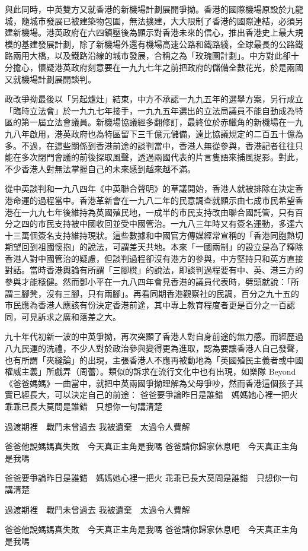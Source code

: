 與此同時，中英雙方又就香港的新機場計劃展開爭拗。香港的國際機場原設於九龍城，隨城市發展已被建築物包圍，無法擴建，大大限制了香港的國際連結，必須另建新機場。港英政府在六四鎮壓後為顯示對香港未來的信心，推出香港史上最大規模的基建發展計劃，除了新機場外還有機場高速公路和鐵路綫，全球最長的公路鐵路兩用大橋，以及鐵路沿線的城市發展，合稱之為「玫瑰園計劃」。中方對此卻十分擔心，懷疑港英政府刻意要在一九九七年之前把政府的儲備全數花光，於是兩國又就機場計劃展開談判。

政改爭拗最後以「另起爐灶」結束，中方不承認一九九五年的選舉方案，另行成立「臨時立法會」於一九九七年接手，一九九五年選出的立法局議員不能自動成為特區的第一屆立法會議員。新機場協議經多翻修訂，最終位於赤鱲角的新機場在一九九八年啟用，港英政府也為特區留下三千億元儲備，遠比協議規定的二百五十億為多。不過，在這些關係到香港前途的談判當中，香港人無從參與，香港記者往往只能在多次閉門會議的前後探取風聲，透過兩國代表的片言隻語來捕風捉影。對此，不少香港人對無法掌握自己的未來感到越來越不滿。

從中英談判和一九八四年《中英聯合聲明》的草議開始，香港人就被排除在決定香港命運的過程當中。香港革新會在一九八二年的民意調查就顯示由七成市民希望香港在一九九七年後維持為英國殖民地，一成半的市民支持改由聯合國託管，只有百分之四的市民支持被中國收回並受中國管治。一九八三年時又有簽名運動，多達六十三萬個簽名支持維持現狀。這些數據和中國官方傳媒經常宣稱的「香港同胞熱切期望回到祖國懷抱」的說法，可謂差天共地。本來「一國兩制」的設立是為了釋除香港人對中國管治的疑慮，但談判過程卻沒有港方的參與，中方堅持只和英方直接對話。當時香港輿論有所謂「三腳櫈」的說法，即談判過程要有中、英、港三方的參與才能穩健。然而鄧小平在一九八四年會見香港的議員代表時，劈頭就說：「所謂三腳凳，沒有三腳，只有兩腳」。再看同期香港觀察社的民調，百分之九十五的市民應為香港人應該有份決定香港前途，其中專上教育程度者更是百分之一百認同，可見訴求之廣和落差之大。

九十年代初新一波的中英爭拗，再次突顯了香港人對自身前途的無力感。而經歷過八九民運的洗禮，不少人對於政治參與變得更為進取，認為要讓香港人自己發聲，也有所謂「夾縫論」的出現，主張香港人不應再被動地為「英國殖民主義者或中國權威主義」所戲弄（周蕾）。類似的訴求在流行文化中也有出現，如樂隊 Beyond 《爸爸媽媽》一曲當中，就把中英兩國爭拗理解為父母爭吵，然而香港這個孩子其實已經長大，可以決定自己的前途：
    爸爸要爭論昨日是誰錯　媽媽她心裡一把火
    乖乖已長大莫問是誰錯　只想你一句講清楚

    過渡期裡　戰鬥未曾過去
    我被遺棄　太過令人費解

    爸爸他說媽媽真失敗　今天真正主角是我嗎
    爸爸請你歸家休息吧　今天真正主角是我嗎
\begin{displayquote}
        爸爸要爭論昨日是誰錯　媽媽她心裡一把火
    乖乖已長大莫問是誰錯　只想你一句講清楚

    過渡期裡　戰鬥未曾過去
    我被遺棄　太過令人費解

    爸爸他說媽媽真失敗　今天真正主角是我嗎
    爸爸請你歸家休息吧　今天真正主角是我嗎
\end{displayquote}

